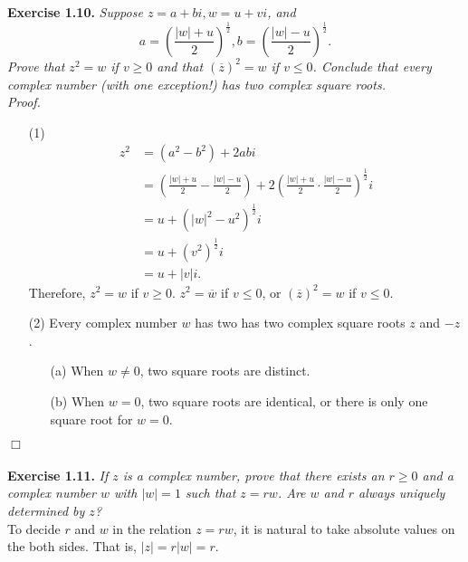 \documentclass{article}
\begin{document}



\textbf{Exercise 1.10.}
\emph{Suppose $z=a+bi, w=u+vi$, and
$$a = \left( \frac{|w|+u}{2} \right)^{\frac{1}{2}},
b = \left( \frac{|w|-u}{2} \right)^{\frac{1}{2}}.$$
Prove that $z^2 = w$ if $v \geq 0$ and that $(\overline{z})^2=w$ if $v \leq 0$.
Conclude that every complex number (with one exception!)
has two complex square roots.} \\

\emph{Proof.}
\begin{enumerate}
\item[(1)]
\begin{align*}
z^2
&= (a^2 - b^2) + 2abi \\
&= \left( \frac{|w|+u}{2} - \frac{|w|-u}{2} \right)
  + 2 \left( \frac{|w|+u}{2} \cdot \frac{|w|-u}{2} \right)^{\frac{1}{2}} i \\
&= u + ( |w|^2 - u^2 )^{\frac{1}{2}} i \\
&= u + ( v^2 )^{\frac{1}{2}} i \\
&= u + |v| i.
\end{align*}
Therefore, $z^2 = w$ if $v \geq 0$.
$z^2 = \overline{w}$ if $v \leq 0$, or $(\overline{z})^2 = w$ if $v \leq 0$.
\item[(2)]
Every complex number $w$
has two has two complex square roots $z$ and $-z$.
  \begin{enumerate}
  \item[(a)]
  When $w \neq 0$, two square roots are distinct.
  \item[(b)]
  When $w = 0$, two square roots are identical,
  or there is only one square root for $w = 0$.
  \end{enumerate}
\end{enumerate}
$\Box$ \\\\






\textbf{Exercise 1.11.}
\emph{If $z$ is a complex number, prove that there exists an $r \geq 0$
and a complex number $w$ with $|w| = 1$ such that $z = rw$.
Are $w$ and $r$ always uniquely determined by $z$?} \\

To decide $r$ and $w$ in the relation $z = rw$, it is natural to take
absolute values on the both sides. That is, $|z| = r|w| = r$. \\
\end{document}
